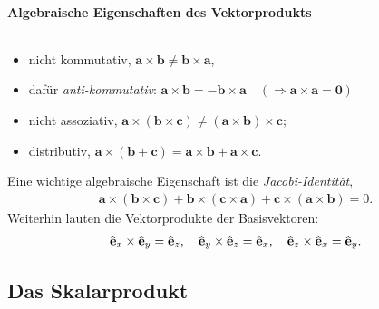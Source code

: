 \paragraph{Algebraische Eigenschaften des Vektorprodukts}$~$

\begin{itemize}
    \item nicht kommutativ, $\bm{a}\times \bm{b} \neq \bm{b} \times \bm{a}$, 
    \item dafür \emph{anti-kommutativ}: $\bm{a}\times\bm{b} = - \bm{b}\times \bm{a} \quad (\Rightarrow \bm{a}\times\bm{a} = \bm{0})$
    \item nicht assoziativ, $\bm{a}\times (\bm{b}\times \bm{c}) \neq (\bm{a}\times\bm{b})\times\bm{c}$; 
    \item distributiv, $\bm{a} \times (\bm{b}+\bm{c}) = \bm{a}\times\bm{b} + \bm{a}\times \bm{c}.$
\end{itemize}

Eine wichtige algebraische Eigenschaft ist die \emph{Jacobi-Identität}, 
\begin{align}
    \bm{a} \times (\bm{b}\times\bm{c}) + \bm{b} \times (\bm{c}\times\bm{a}) + \bm{c}\times (\bm{a}\times\bm{b}) = 0.
\end{align}
Weiterhin lauten die Vektorprodukte der Basisvektoren: 
\begin{align}
    \vu{e}_x \times \vu{e}_y = \vu{e}_z, \quad \vu{e}_y \times \vu{e}_z = \vu{e}_x, \quad \vu{e}_z \times \vu{e}_x = \vu{e}_y.
\end{align}


\subsection{Das Skalarprodukt}

